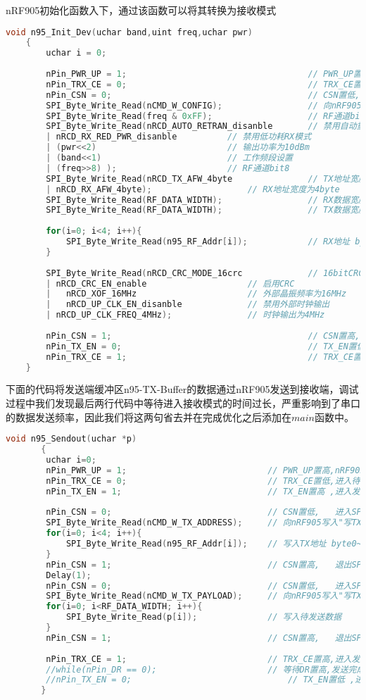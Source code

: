 \documentclass{zjureport}
\begin{document}
	nRF905初始化函数入下，通过该函数可以将其转换为接收模式
	\begin{lstlisting}[language=C]
	void n95_Init_Dev(uchar band,uint freq,uchar pwr)
	{
		uchar i = 0;
		
		nPin_PWR_UP = 1;									// PWR_UP置高,nRF905进入上电模式	
		nPin_TRX_CE = 0;									// TRX_CE置低,进入待机和SPI操作模式
		nPin_CSN = 0;										// CSN置低,   进入SPI操作模式
		SPI_Byte_Write_Read(nCMD_W_CONFIG);					// 向nRF905发送"写配置寄存器命令"
		SPI_Byte_Write_Read(freq & 0xFF);					// RF通道bit7:0
		SPI_Byte_Write_Read(nRCD_AUTO_RETRAN_disanble		// 禁用自动重发 
		| nRCD_RX_RED_PWR_disanble			// 禁用低功耗RX模式
		| (pwr<<2)							// 输出功率为10dBm
		| (band<<1)							// 工作频段设置
		| (freq>>8) );						// RF通道bit8
		SPI_Byte_Write_Read(nRCD_TX_AFW_4byte				// TX地址宽度为4byte
		| nRCD_RX_AFW_4byte);					// RX地址宽度为4byte
		SPI_Byte_Write_Read(RF_DATA_WIDTH);					// RX数据宽度
		SPI_Byte_Write_Read(RF_DATA_WIDTH);					// TX数据宽度
		
		for(i=0; i<4; i++){
			SPI_Byte_Write_Read(n95_RF_Addr[i]);			// RX地址 byte0~3
		}
		
		SPI_Byte_Write_Read(nRCD_CRC_MODE_16crc				// 16bitCRC
		| nRCD_CRC_EN_enable					// 启用CRC
		|	nRCD_XOF_16MHz						// 外部晶振频率为16MHz
		|	nRCD_UP_CLK_EN_disanble				// 禁用外部时钟输出
		| nRCD_UP_CLK_FREQ_4MHz);				// 时钟输出为4MHz
		
		nPin_CSN = 1;										// CSN置高,   退出SPI操作模式
		nPin_TX_EN = 0;										// TX_EN置低 ,进入接收模式
		nPin_TRX_CE = 1;									// TRX_CE置高,进入工作模式
	}      
\end{lstlisting}   
	   
	   下面的代码将发送端缓冲区n95-TX-Buffer的数据通过nRF905发送到接收端，调试过程中我们发现最后两行代码中等待进入接收模式的时间过长，严重影响到了串口的数据发送频率，因此我们将这两句省去并在完成优化之后添加在$main$函数中。
	   \begin{lstlisting}[language=C]
	   void n95_Sendout(uchar *p)
	   {
	   	uchar i=0;
	   	nPin_PWR_UP = 1;							// PWR_UP置高,nRF905进入上电模式
	   	nPin_TRX_CE = 0;							// TRX_CE置低,进入待机和SPI操作模式
	   	nPin_TX_EN = 1;								// TX_EN置高 ,进入发送模式
	   	
	   	nPin_CSN = 0;								// CSN置低,   进入SPI操作模式
	   	SPI_Byte_Write_Read(nCMD_W_TX_ADDRESS);		// 向nRF905写入"写TX地址"指令
	   	for(i=0; i<4; i++){
	   		SPI_Byte_Write_Read(n95_RF_Addr[i]);	// 写入TX地址 byte0~3,注意此处应与"nRCD_TX_AFW"的配置一致
	   	}
	   	nPin_CSN = 1;								// CSN置高,   退出SPI操作模式
	   	Delay(1);
	   	nPin_CSN = 0;								// CSN置低,   进入SPI操作模式
	   	SPI_Byte_Write_Read(nCMD_W_TX_PAYLOAD);		// 向nRF905写入"写TX数据"指令
	   	for(i=0; i<RF_DATA_WIDTH; i++){
	   		SPI_Byte_Write_Read(p[i]);				// 写入待发送数据
	   	}
	   	nPin_CSN = 1;								// CSN置高,   退出SPI操作模式
	   	
	   	nPin_TRX_CE = 1;							// TRX_CE置高,进入发送模式
	   	//while(nPin_DR == 0);						// 等待DR置高,发送完成
	   	//nPin_TX_EN = 0;								// TX_EN置低 ,进入接收模式
	   }
	\end{lstlisting} 
	   
\end{document}
